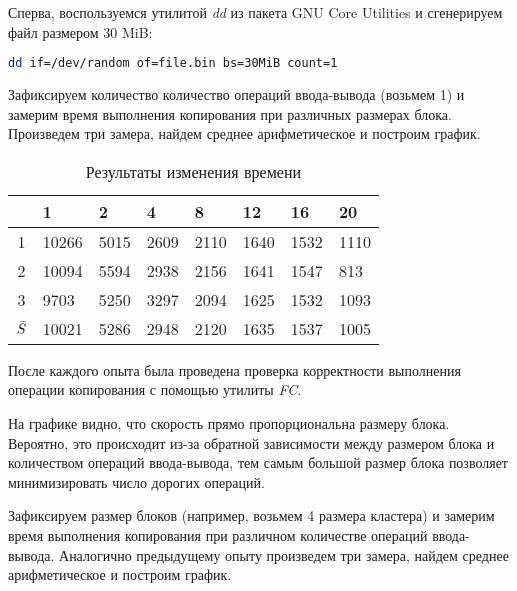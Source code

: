 \documentclass[a4paper,14pt]{extarticle}
\newcommand{\Code}[1]{\textit{#1}}
\begin{document}
Сперва, воспользуемся утилитой \Code{dd} из пакета GNU Core Utilities и
сгенерируем файл размером 30 MiB:
%
\begin{lstlisting}[language=Bash]
dd if=/dev/random of=file.bin bs=30MiB count=1
\end{lstlisting}
%

Зафиксируем количество количество операций ввода-вывода (возьмем 1) и замерим
время выполнения копирования при различных размерах блока. Произведем три
замера, найдем среднее арифметическое и построим график.

\begin{table}[H]
    \centering
    \caption{Результаты изменения времени}
    \begin{tabularx}{\textwidth}{|c|X|X|X|X|X|X|X|}
        \hline
                  & 1 & 2 & 4 & 8 & 12 & 16 & 20 \\
        \hline
                1 & 10266 & 5015 & 2609 & 2110 & 1640 & 1532 & 1110 \\
        \hline
                2 & 10094 & 5594 & 2938 & 2156 & 1641 & 1547 & 813  \\
        \hline
                3 & 9703  & 5250 & 3297 & 2094 & 1625 & 1532 & 1093 \\
        \hline
        $\Bar{S}$ & 10021 & 5286 & 2948 & 2120 & 1635 & 1537 & 1005 \\
        \hline
    \end{tabularx}
\end{table}

После каждого опыта была проведена проверка корректности выполнения операции
копирования с помощью утилиты \Code{FC}.


На графике видно, что скорость прямо пропорциональна размеру блока. Вероятно,
это происходит из-за обратной зависимости между размером блока и количеством
операций ввода-вывода, тем самым большой размер блока позволяет минимизировать
число дорогих операций.


Зафиксируем размер блоков (например, возьмем 4 размера кластера) и замерим
время выполнения копирования при различном количестве операций ввода-вывода.
Аналогично предыдущему опыту произведем три замера, найдем среднее
арифметическое и построим график.
\end{document}
